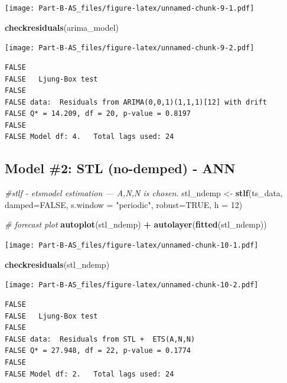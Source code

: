 \documentclass[openany]{book}
\newenvironment{Shaded}{\begin{snugshade}}{\end{snugshade}}
\newcommand{\KeywordTok}[1]{\textcolor[rgb]{0.13,0.29,0.53}{\textbf{#1}}}
\newcommand{\DataTypeTok}[1]{\textcolor[rgb]{0.13,0.29,0.53}{#1}}
\newcommand{\DecValTok}[1]{\textcolor[rgb]{0.00,0.00,0.81}{#1}}
\newcommand{\StringTok}[1]{\textcolor[rgb]{0.31,0.60,0.02}{#1}}
\newcommand{\CommentTok}[1]{\textcolor[rgb]{0.56,0.35,0.01}{\textit{#1}}}
\newcommand{\OtherTok}[1]{\textcolor[rgb]{0.56,0.35,0.01}{#1}}
\newcommand{\OperatorTok}[1]{\textcolor[rgb]{0.81,0.36,0.00}{\textbf{#1}}}
\newcommand{\NormalTok}[1]{#1}
\begin{document}
\texttt{[image: Part-B-AS\_files/figure-latex/unnamed-chunk-9-1.pdf]}

\begin{Shaded}
\begin{Highlighting}[]
\KeywordTok{checkresiduals}\NormalTok{(arima_model)}
\end{Highlighting}
\end{Shaded}

\texttt{[image: Part-B-AS\_files/figure-latex/unnamed-chunk-9-2.pdf]}

\begin{verbatim}
FALSE 
FALSE   Ljung-Box test
FALSE 
FALSE data:  Residuals from ARIMA(0,0,1)(1,1,1)[12] with drift
FALSE Q* = 14.209, df = 20, p-value = 0.8197
FALSE 
FALSE Model df: 4.   Total lags used: 24
\end{verbatim}

\subsection{Model \#2: STL (no-demped) -
ANN}\label{model-2-stl-no-demped---ann}

\begin{Shaded}
\begin{Highlighting}[]
\CommentTok{#stlf - etsmodel estimation --- A,N,N is chosen.}
\NormalTok{stl_ndemp <-}\StringTok{ }\KeywordTok{stlf}\NormalTok{(ts_data, }\DataTypeTok{damped=}\OtherTok{FALSE}\NormalTok{, }\DataTypeTok{s.window =} \StringTok{"periodic"}\NormalTok{, }\DataTypeTok{robust=}\OtherTok{TRUE}\NormalTok{, }\DataTypeTok{h =} \DecValTok{12}\NormalTok{)}

\CommentTok{# forecast plot}
\KeywordTok{autoplot}\NormalTok{(stl_ndemp) }\OperatorTok{+}\StringTok{ }\KeywordTok{autolayer}\NormalTok{(}\KeywordTok{fitted}\NormalTok{(stl_ndemp))}
\end{Highlighting}
\end{Shaded}

\texttt{[image: Part-B-AS\_files/figure-latex/unnamed-chunk-10-1.pdf]}

\begin{Shaded}
\begin{Highlighting}[]
\KeywordTok{checkresiduals}\NormalTok{(stl_ndemp)}
\end{Highlighting}
\end{Shaded}

\texttt{[image: Part-B-AS\_files/figure-latex/unnamed-chunk-10-2.pdf]}

\begin{verbatim}
FALSE 
FALSE   Ljung-Box test
FALSE 
FALSE data:  Residuals from STL +  ETS(A,N,N)
FALSE Q* = 27.948, df = 22, p-value = 0.1774
FALSE 
FALSE Model df: 2.   Total lags used: 24
\end{verbatim}
\end{document}
